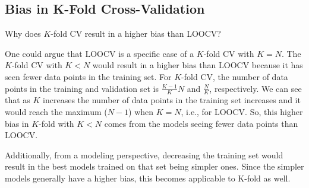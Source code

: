 \documentclass{article}
\begin{document}
\subsection{Bias in K-Fold Cross-Validation}

\question
Why does $K$-fold CV result in a higher bias than LOOCV?

\answer
One could argue that LOOCV is a specific case of a $K$-fold CV with $K=N$.
The $K$-fold CV with $K<N$ would result in a higher bias than LOOCV because it has seen fewer data points in the training set.
For $K$-fold CV, the number of data points in the training and validation set is $\frac{K-1}{K} N$ and $\frac{N}{K}$, respectively.
We can see that as $K$ increases the number of data points in the training set increases and it would reach the maximum ($N-1$) when $K=N$, i.e., for LOOCV.
So, this higher bias in $K$-fold with $K<N$ comes from the models seeing fewer data points than LOOCV.

Additionally, from a modeling perspective, decreasing the training set would result in the best models trained on that set being simpler ones.
Since the simpler models generally have a higher bias, this becomes applicable to K-fold as well.


\clearpage

% 
% 

\end{document}
